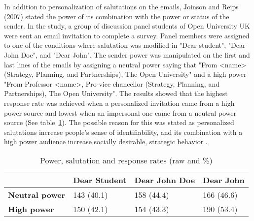 In addition to personalization of salutations on the emails, Joinson and Reips (2007) stated the power of its combination with the power or status of the sender. In the study, a group of discussion panel students of Open University UK were sent an email invitation to complete a survey. Panel members were assigned to one of the conditions where salutation was modified in "Dear student", "Dear John Doe", and "Dear John". The sender power was manipulated on the first and last lines of the emails by assigning a neutral power saying that "From <name> (Strategy, Planning, and Partnerships), The Open University" and a high power "From Professor <name>, Pro-vice chancellor (Strategy, Planning, and Partnerships), The Open University". The results showed that the highest response rate was achieved when a personalized invitation came from a high power source and lowest when an impersonal one came from a neutral power source (See table~\ref{tab:pow_sal_res}). The possible reason for this was stated as personalized salutations increase people's sense of identifiability,  and its combination with a high power audience increase socially desirable, strategic behavior \citep{Joinson2007}.

\begin{table}[!ht]
\begin{center}
	\caption[]{Power, salutation and response rates (raw and \%) \citep{Joinson2007}} \label{tab:pow_sal_res}
    \begin{tabular}{ p{3cm} p{3cm}  p{3cm}  p{3cm} }
	\hline
	& \textbf{Dear Student} & \textbf{Dear John Doe} & \textbf{Dear John} \\ \hline
	\textbf{Neutral power} & 143 (40.1) & 158 (44.4) & 166 (46.6) \\
	\textbf{High power} & 150 (42.1) & 154 (43.3) & 190 (53.4) \\ \hline
    \end{tabular}
\end{center}
\end{table}

